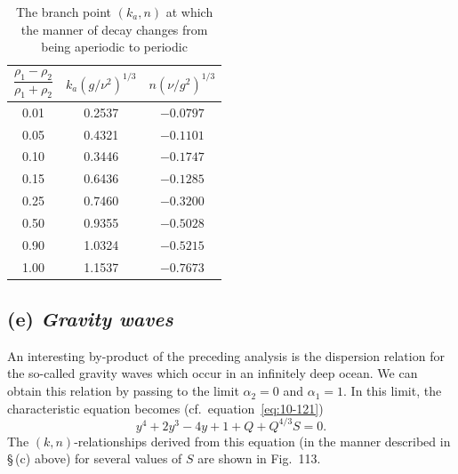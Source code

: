 \begin{table}[ht]
\centering
\caption{The branch point $(k_a, n)$ at which the manner of decay changes from being aperiodic to periodic}
\label{tab:XLVIII}
\small
\begin{tabular}{ccc}
\hline
$\dfrac{\rho_1-\rho_2}{\rho_1+\rho_2}$ & $k_a(g/\nu^2)^{1/3}$ & $n(\nu/g^2)^{1/3}$ \\[6pt]
\hline
0.01 & 0.2537 & $-0.0797$ \\
0.05 & 0.4321 & $-0.1101$ \\
0.10 & 0.3446 & $-0.1747$ \\
0.15 & 0.6436 & $-0.1285$ \\
0.25 & 0.7460 & $-0.3200$ \\
0.50 & 0.9355 & $-0.5028$ \\
0.90 & 1.0324 & $-0.5215$ \\
1.00 & 1.1537 & $-0.7673$ \\
\hline
\end{tabular}
\end{table}


\subsection*{(e) \textit{Gravity waves}}

An interesting by-product of the preceding analysis is the dispersion relation for the so-called gravity waves which occur in an infinitely deep ocean. We can obtain this relation by passing to the limit $\alpha_2 = 0$ and $\alpha_1 = 1$. In this limit, the characteristic equation becomes (cf.\ equation~\eqref{eq:10-121})
\begin{equation}
\label{eq:10-136}
y^4+2y^3-4y+1+Q+Q^{4/3}S = 0.
\end{equation}
The $(k,n)$-relationships derived from this equation (in the manner described in \S\,(c) above) for several values of $S$ are shown in Fig.~113.


